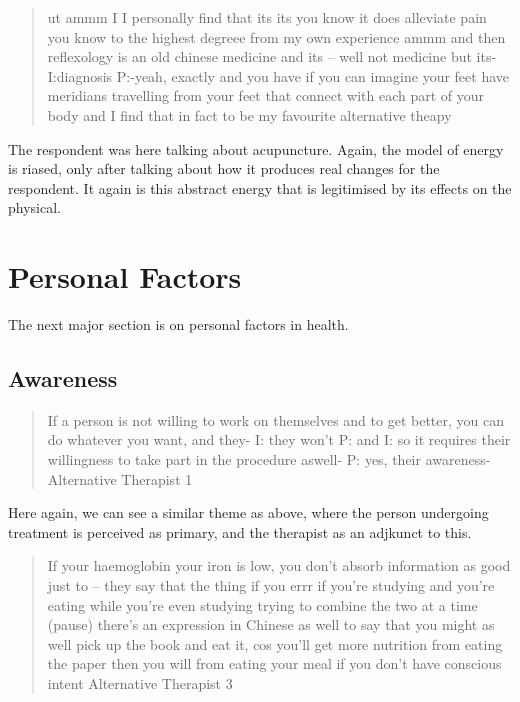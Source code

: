 \begin{quotation}
  ut ammm I I personally find that its its you know it does alleviate pain you know to the highest degreee from my own experience ammm and then reflexology is an old chinese medicine and its – well not medicine but its-
I:diagnosis
P:-yeah, exactly and you have if you can imagine your feet have meridians travelling from your feet that connect with each part of your body and I find that in fact to be my favourite alternative theapy

\end{quotation}

The respondent was here talking about acupuncture. Again, the model of energy is riased, only after talking about how it produces real changes for the respondent. It again is this abstract energy that is legitimised by its effects on the physical. 

\section{Personal Factors}
\label{sec:personal-factors}

The next major section is on personal factors in health.

\subsection{Awareness}
\label{sec:awareness}

\begin{quotation}
  If a person is not willing to work on themselves and to get better, you can do whatever you want, and they-
I: they won't
P: and 
I: so it requires their willingness to take part in the procedure aswell-
P: yes, their awareness-
Alternative Therapist 1
\end{quotation}


Here again, we can see a similar theme as above, where the person undergoing treatment is perceived as primary, and the therapist as an adjkunct to this. 


\begin{quotation}
   If your haemoglobin your iron is low, you don't absorb information as good just to – they say that the thing if you errr if you're studying and you're eating while you're even studying trying to combine the two at a time (pause) there's an expression in Chinese as well to say that you might as well pick up the book and eat it, cos you'll get more nutrition from eating the paper then you will from eating your meal if you don't have conscious intent 
Alternative Therapist 3
\end{quotation}


